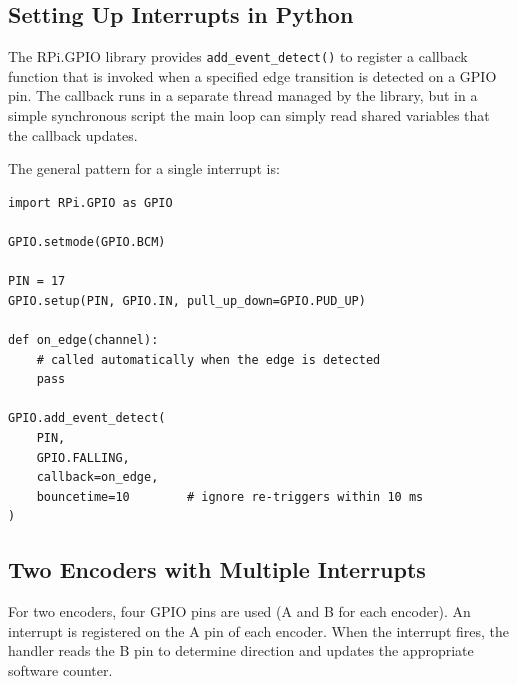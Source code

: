 \subsection{Setting Up Interrupts in Python}

The RPi.GPIO library provides \texttt{add\_event\_detect()} to register a callback
function that is invoked when a specified edge transition is detected on a GPIO pin.
The callback runs in a separate thread managed by the library, but in a simple
synchronous script the main loop can simply read shared variables that the callback
updates.

The general pattern for a single interrupt is:

\begin{verbatim}
import RPi.GPIO as GPIO

GPIO.setmode(GPIO.BCM)

PIN = 17
GPIO.setup(PIN, GPIO.IN, pull_up_down=GPIO.PUD_UP)

def on_edge(channel):
    # called automatically when the edge is detected
    pass

GPIO.add_event_detect(
    PIN,
    GPIO.FALLING,
    callback=on_edge,
    bouncetime=10        # ignore re-triggers within 10 ms
)
\end{verbatim}

\subsection{Two Encoders with Multiple Interrupts}

For two encoders, four GPIO pins are used (A and B for each encoder). An interrupt
is registered on the A pin of each encoder. When the interrupt fires, the handler
reads the B pin to determine direction and updates the appropriate software counter.

